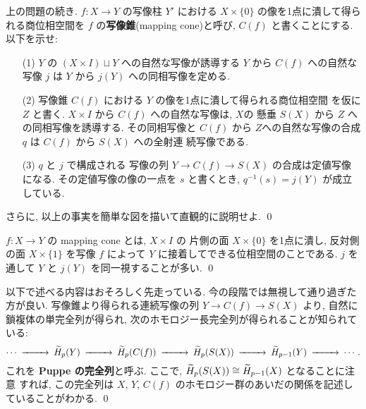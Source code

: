 \documentclass[12pt,twoside]{jarticle}
\begin{document}
\begin{question}
  上の問題の続き. $f : X \to Y$ の写像柱 $Y'$ における $X\times\{0\}$ 
  の像を1点に潰して得られる商位相空間を $f$ の{\bf 写像錐}(mapping
  cone)と呼び, $C(f)$ と書くことにする. 以下を示せ:
  \begin{enumerate}
  \item[(1)] $Y$ の $(X\times I)\sqcup Y$ への自然な写像が誘導する $Y$ から
    $C(f)$ への自然な写像 $j$ は $Y$ から $j(Y)$ への同相写像を定める.
  \item[(2)] 写像錐 $C(f)$ における $Y$ の像を1点に潰して得られる商位相空間
    を仮に $Z$ と書く. $X\times I$ から $C(f)$ への自然な写像は, $X$の
    懸垂 $S(X)$ から $Z$ への同相写像を誘導する. その同相写像と $C(f)$ 
    から $Z$への自然な写像の合成 $q$ は $C(f)$ から $S(X)$ への全射連
    続写像である.
  \item[(3)] $q$ と $j$ で構成される
    写像の列 $Y \to C(f) \to S(X)$ の合成は定値写像になる. 
    その定値写像の像の一点を $s$ と書くとき, $q^{-1}(s)=j(Y)$ が成立している. 
  \end{enumerate}
  さらに, 以上の事実を簡単な図を描いて直観的に説明せよ. \qed
\end{question}

\begin{guide}
$f : X \to Y$ の mapping cone とは, $X\times I$ の 
片側の面 $X\times\{0\}$ を1点に潰し, 反対側の面 $X\times\{1\}$ を写像 %
$f$ によって $Y$ に接着してできる位相空間のことである. $j$ を通して %
$Y$ と $j(Y)$ を同一視することが多い.
\qed
\end{guide}

\begin{guide}
  以下で述べる内容はおそろしく先走っている.
  今の段階では無視して通り過ぎた方が良い.
  写像錐より得られる連続写像の列 %
  $Y \to  C(f) \to S(X)$ より, 自然に鎖複体の単完全列が得られ, 
  次のホモロジー長完全列が得られることが知られている:
  \begin{equation*}
  \begin{CD}
    \cdots @>>>
    \widetilde{H}_p(Y) @>>>
    \widetilde{H}_p(C(f)) @>>> 
    \widetilde{H}_p(S(X)) @>>>
    \widetilde{H}_{p-1}(Y) @>>> \cdots.
  \end{CD}
  \end{equation*}
  これを {\bf Puppe の完全列}と呼ぶ. ここで, %
  $\widetilde{H}_p(S(X))\cong \widetilde{H}_{p-1}(X)$ となることに注意
  すれば, この完全列は $X$, $Y$, $C(f)$ のホモロジー群のあいだの関係を記述し
  ていることがわかる.
  \qed
\end{guide}
\end{document}
